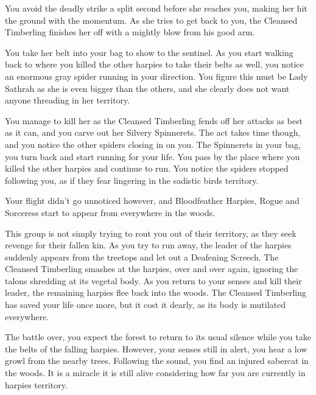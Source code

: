 
You avoid the deadly strike a split second before she reaches you, making her hit the ground with the momentum. As she tries to get back to you, the Cleansed Timberling finishes her off with a mightly blow from his good arm.

You take her belt into your bag to show to the sentinel. As you start walking back to where you killed the other harpies to take their belts as well, you notice an enormous gray spider running in your direction. You figure this must be Lady Sathrah as she is even bigger than the others, and she clearly does not want anyone threading in her territory.

You manage to kill her as the Cleansed Timberling fends off her attacks as best as it can, and you carve out her Silvery Spinnerets. The act takes time though, and you notice the other spiders closing in on you. The Spinnerets in your bag, you turn back and start running for your life. You pass by the place where you killed the other harpies and continue to run. You notice the spiders stopped following you, as if they fear lingering in the sadistic birds territory.

Your flight didn't go unnoticed however, and Bloodfeather Harpies, Rogue and Sorceress start to appear from everywhere in the woods.


This group is not simply trying to rout you out of their territory, as they seek revenge for their fallen kin. As you try to run away, the leader of the harpies suddenly appears from the treetops and let out a Deafening Screech. The Cleansed Timberling smashes at the harpies, over and over again, ignoring the talons shredding at its vegetal body. As you return to your senses and kill their leader, the remaining harpies flee back into the woods. The Cleansed Timberling has saved your life once more, but it cost it dearly, as its body is mutilated everywhere.

The battle over, you expect the forest to return to its usual silence while you take the belts of the falling harpies. However, your senses still in alert, you hear a low growl from the nearby trees. Following the sound, you find an injured sabercat in the woods. It is a miracle it is still alive considering how far you are currently in harpies territory.

